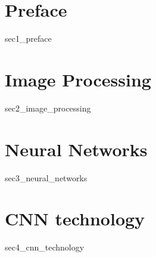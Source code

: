 \section{Preface}
{sec1_preface}

\section{Image Processing}
{sec2_image_processing}

\section{Neural Networks}
{sec3_neural_networks}

\section{CNN technology}
{sec4_cnn_technology}